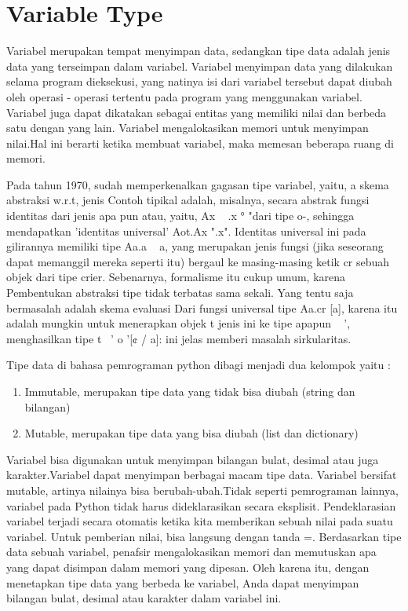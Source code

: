 \section{Variable Type}
Variabel merupakan tempat menyimpan data, sedangkan tipe data adalah jenis data yang terseimpan dalam variabel. Variabel menyimpan data yang dilakukan selama program dieksekusi, yang natinya isi dari variabel tersebut dapat diubah oleh operasi - operasi tertentu pada program yang menggunakan variabel. Variabel juga dapat dikatakan sebagai entitas yang memiliki nilai dan berbeda satu dengan yang lain. Variabel mengalokasikan memori untuk menyimpan nilai.Hal ini berarti ketika membuat variabel, maka  memesan beberapa ruang di memori. 

Pada tahun 1970, sudah memperkenalkan gagasan tipe variabel, yaitu, a
skema abstraksi w.r.t, jenis Contoh tipikal adalah, misalnya, secara abstrak
fungsi identitas dari jenis apa pun atau, yaitu, Ax ~ .x ° "dari tipe o-, sehingga mendapatkan
'identitas universal' Aot.Ax ".x". Identitas universal ini pada gilirannya memiliki tipe Aa.a ~ a,
yang merupakan jenis fungsi (jika seseorang dapat memanggil mereka seperti itu) bergaul ke masing-masing
ketik cr sebuah objek dari tipe crier. Sebenarnya, formalisme itu cukup umum, karena
Pembentukan abstraksi tipe tidak terbatas sama sekali. Yang tentu saja bermasalah
adalah skema evaluasi Dari fungsi universal tipe Aa.cr [a], karena itu
adalah mungkin untuk menerapkan objek t jenis ini ke tipe apapun ~ ', menghasilkan tipe t {~'}
o '[¢ / a]: ini jelas memberi masalah sirkularitas.


Tipe data di bahasa pemrograman python dibagi menjadi dua kelompok yaitu :
\begin{enumerate}
	\item Immutable, merupakan tipe data yang tidak bisa diubah (string dan bilangan)
	\item Mutable, merupakan tipe data yang bisa diubah (list dan dictionary)
\end{enumerate}  

Variabel bisa digunakan untuk menyimpan bilangan bulat, desimal atau juga karakter.Variabel dapat menyimpan berbagai macam tipe data. Variabel bersifat mutable, artinya nilainya bisa berubah-ubah.Tidak seperti pemrograman lainnya, variabel pada Python tidak harus dideklarasikan secara eksplisit. Pendeklarasian variabel terjadi secara otomatis ketika kita memberikan sebuah nilai pada suatu variabel. Untuk pemberian nilai, bisa langsung dengan tanda =. Berdasarkan tipe data sebuah variabel, penafsir mengalokasikan memori dan memutuskan apa yang dapat disimpan dalam memori yang dipesan. Oleh karena itu, dengan menetapkan tipe data yang berbeda ke variabel, Anda dapat menyimpan bilangan bulat, desimal atau karakter dalam variabel ini.

